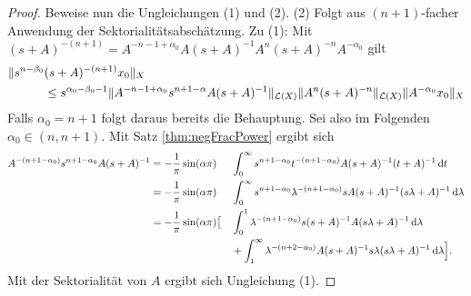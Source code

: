 \begin{proof}
  Beweise nun die Ungleichungen (1) und (2).
  (2) Folgt aus $(n + 1)$-facher Anwendung der Sektorialitätsabschätzung.
  Zu (1): Mit $(s + A)^{-(n + 1)} = A^{-n - 1 + \alpha_0} A (s + A)^{-1} A^n (s + A)^{-n} A^{-\alpha_0}$ gilt
  \begin{align*}
    \|s^{n - \beta_0} &(s + A)^{- (n + 1)} x_0 \|_X \\
    &\leq s^{\alpha_0 - \beta_0 - 1} \|A^{-n - 1+ \alpha_0} s^{n + 1 - \alpha} A(s + A)^{-1}\|_{\mathcal{L}(X)} \|A^n(s+A)^{-n}\|_{\mathcal{L}(X)} \|A^{-\alpha_0} x_0 \|_X
  \end{align*}
  Falls $\alpha_0 = n + 1$ folgt daraus bereits die Behauptung.
  Sei also im Folgenden $\alpha_0 \in (n, n + 1)$.
  Mit Satz \ref{thm:negFracPower} ergibt sich
  \begin{alignat*}{2}
    A^{-(n + 1 - \alpha_0)} s^{n + 1 - \alpha_0} A (s + A)^{-1}
    &= -\frac{1}{\pi} \sin(\alpha \pi) &&\int_0^\infty s^{n + 1 - \alpha_0} t^{-(n + 1 - \alpha_0)} A (s + A)^{-1} (t + A)^{-1} \, {\operatorname{d}\!{t}} \\
    &= -\frac{1}{\pi} \sin(\alpha \pi) &&\int_0^\infty s^{n + 1 - \alpha_0} \lambda^{-(n + 1 - \alpha_0)} s A(s + A)^{-1} (s\lambda + A)^{-1} \, {\operatorname{d}\!{\lambda}} \\
    &= -\frac{1}{\pi} \sin(\alpha \pi) \big[ &&\int_0^1 \lambda^{-(n + 1 - \alpha_0)} s (s + A)^{-1} A (s \lambda + A)^{-1} \, {\operatorname{d}\!{\lambda}} \\
    &  &&+\int_1^\infty \lambda^{-(n + 2 - \alpha_0)} A (s + A)^{-1} s \lambda (s \lambda + A)^{-1} \, {\operatorname{d}\!{\lambda}} \Big].
  \end{alignat*}
  Mit der Sektorialität von $A$ ergibt sich Ungleichung (1).
\end{proof}
